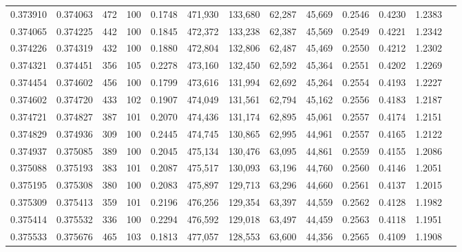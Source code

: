 \begin{tabular}{rrrrrrrrrrrrr}
0.373910 & 0.374063 &   472 & 100 &                                     0.1748 & 471,930 & 133,680 &  62,287 &  45,669 & 0.2546 & 0.4230 & 1.2383 \\
0.374065 & 0.374225 &   442 & 100 &                                     0.1845 & 472,372 & 133,238 &  62,387 &  45,569 & 0.2549 & 0.4221 & 1.2342 \\
0.374226 & 0.374319 &   432 & 100 &                                     0.1880 & 472,804 & 132,806 &  62,487 &  45,469 & 0.2550 & 0.4212 & 1.2302 \\
0.374321 & 0.374451 &   356 & 105 &                                     0.2278 & 473,160 & 132,450 &  62,592 &  45,364 & 0.2551 & 0.4202 & 1.2269 \\
0.374454 & 0.374602 &   456 & 100 &                                     0.1799 & 473,616 & 131,994 &  62,692 &  45,264 & 0.2554 & 0.4193 & 1.2227 \\
0.374602 & 0.374720 &   433 & 102 &                                     0.1907 & 474,049 & 131,561 &  62,794 &  45,162 & 0.2556 & 0.4183 & 1.2187 \\
0.374721 & 0.374827 &   387 & 101 &                                     0.2070 & 474,436 & 131,174 &  62,895 &  45,061 & 0.2557 & 0.4174 & 1.2151 \\
0.374829 & 0.374936 &   309 & 100 &                                     0.2445 & 474,745 & 130,865 &  62,995 &  44,961 & 0.2557 & 0.4165 & 1.2122 \\
0.374937 & 0.375085 &   389 & 100 &                                     0.2045 & 475,134 & 130,476 &  63,095 &  44,861 & 0.2559 & 0.4155 & 1.2086 \\
0.375088 & 0.375193 &   383 & 101 &                                     0.2087 & 475,517 & 130,093 &  63,196 &  44,760 & 0.2560 & 0.4146 & 1.2051 \\
0.375195 & 0.375308 &   380 & 100 &                                     0.2083 & 475,897 & 129,713 &  63,296 &  44,660 & 0.2561 & 0.4137 & 1.2015 \\
0.375309 & 0.375413 &   359 & 101 &                                     0.2196 & 476,256 & 129,354 &  63,397 &  44,559 & 0.2562 & 0.4128 & 1.1982 \\
0.375414 & 0.375532 &   336 & 100 &                                     0.2294 & 476,592 & 129,018 &  63,497 &  44,459 & 0.2563 & 0.4118 & 1.1951 \\
0.375533 & 0.375676 &   465 & 103 &                                     0.1813 & 477,057 & 128,553 &  63,600 &  44,356 & 0.2565 & 0.4109 & 1.1908 \\

\end{tabular}
